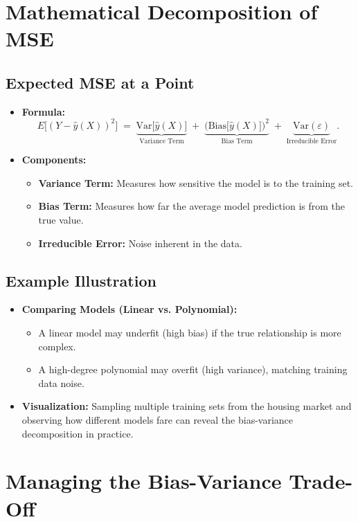 \documentclass{article}
\begin{document}
\section{Mathematical Decomposition of MSE}

\subsection{Expected MSE at a Point}
\begin{itemize}
    \item \textbf{Formula:}
    \[
    E\bigl[(Y - \hat{y}(X))^2\bigr] \;=\; \underbrace{\text{Var}\bigl[\hat{y}(X)\bigr]}_{\text{Variance Term}} 
    \;+\; \underbrace{\bigl(\text{Bias}\bigl[\hat{y}(X)\bigr]\bigr)^2}_{\text{Bias Term}} 
    \;+\; \underbrace{\text{Var}(\varepsilon)}_{\text{Irreducible Error}}.
    \]
    \item \textbf{Components:}
    \begin{itemize}
        \item \textbf{Variance Term:} Measures how sensitive the model is to the training set.
        \item \textbf{Bias Term:} Measures how far the average model prediction is from the true value.
        \item \textbf{Irreducible Error:} Noise inherent in the data.
    \end{itemize}
\end{itemize}

\subsection{Example Illustration}
\begin{itemize}
    \item \textbf{Comparing Models (Linear vs. Polynomial):}
    \begin{itemize}
        \item A linear model may underfit (high bias) if the true relationship is more complex.
        \item A high-degree polynomial may overfit (high variance), matching training data noise.
    \end{itemize}
    \item \textbf{Visualization:} Sampling multiple training sets from the housing market and observing how different models fare can reveal the bias-variance decomposition in practice.
\end{itemize}

\section{Managing the Bias-Variance Trade-Off}
\end{document}
